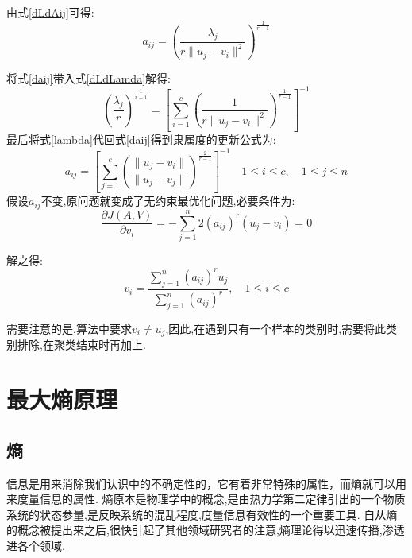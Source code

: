 由式\ref{dLdAij}可得:
\begin{equation}
    a_{i j}=\left( \frac{\lambda_j}{r \|u_{j}-v_{i}\|^2} \right)^{\frac{1}{r-1}}
    \label{daij}
\end{equation}

将式\ref{daij}带入式\ref{dLdLamda}解得:
\begin{equation}
    \left(\frac{\lambda_j}{r}\right)^{\frac{1}{r-1}}=\left[\sum\limits_{i=1}^c( \frac{1}{r \|u_{j}-v_{i}\|^2})^{\frac{1}{r-1}} \right]^{-1}
    \label{lambda}
\end{equation}
最后将式\ref{lambda}代回式\ref{daij}得到隶属度的更新公式为:
\begin{equation}
    a_{i j}=\left[\sum\limits_{j=1}^c\left( \frac{\|u_{j}-v_{i}\|}{\|u_{j}-v_{j}\|} \right)^{\frac{2}{r-1}}\right]^{-1}
    \quad 1 \leqslant i \leqslant c,\quad 1 \leqslant j \leqslant n
    \label{aij}
\end{equation}
假设$a_{i j}$不变,原问题就变成了无约束最优化问题,必要条件为:
\begin{equation}
        \frac{\partial J(A, V)}{\partial v_{i}}=-\sum_{j=1}^{n} 2\left(a_{i j}\right)^{r}\left(u_{j}-v_{i}\right)=0 
\end{equation}

解之得:
\begin{equation}
    v_{i}=\frac{\sum\limits_{j=1}^{n}\left(a_{i j}\right)^{r} u_{j}}{\sum\limits_{j=1}^{n}\left(a_{i j}\right)^{r}}, \quad 1 \leqslant i \leqslant c
    \label{vij}
\end{equation}
\par
需要注意的是,算法中要求$v_i \neq  u_j$,因此,在遇到只有一个样本的类别时,需要将此类别排除,在聚类结束时再加上.

\section{最大熵原理}
\subsection{熵}
信息是用来消除我们认识中的不确定性的，它有着非常特殊的属性，而熵就可以用来度量信息的属性.
熵原本是物理学中的概念,是由热力学第二定律引出的一个物质系统的状态参量,是反映系统的混乱程度,度量信息有效性的一个重要工具.
自从熵的概念被提出来之后,很快引起了其他领域研究者的注意,熵理论得以迅速传播,渗透进各个领域.
